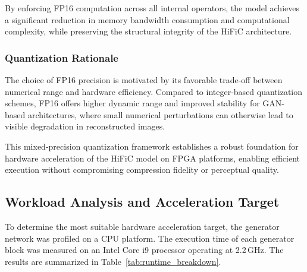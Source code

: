 By enforcing FP16 computation across all internal operators, the model achieves a significant reduction in memory bandwidth consumption and computational complexity, while preserving the structural integrity of the HiFiC architecture.

\subsubsection{Quantization Rationale}

The choice of FP16 precision is motivated by its favorable trade-off between numerical range and hardware efficiency. Compared to integer-based quantization schemes, FP16 offers higher dynamic range and improved stability for GAN-based architectures, where small numerical perturbations can otherwise lead to visible degradation in reconstructed images.

This mixed-precision quantization framework establishes a robust foundation for hardware acceleration of the HiFiC model on FPGA platforms, enabling efficient execution without compromising compression fidelity or perceptual quality.

\subsection{Workload Analysis and Acceleration Target}

To determine the most suitable hardware acceleration target, the generator network was profiled on a CPU platform. The execution time of each generator block was measured on an Intel Core i9 processor operating at 2.2\,GHz. The results are summarized in Table~\ref{tab:runtime_breakdown}.


